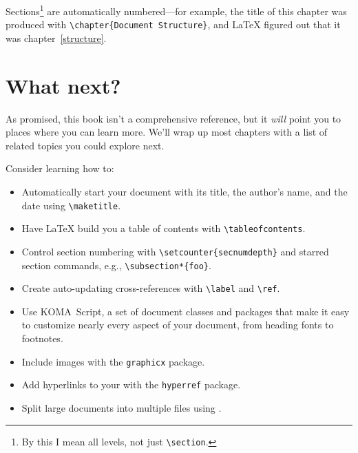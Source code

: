 Sections\footnote{By this I mean all levels, not just
\texttt{\textbackslash section}.}
are automatically numbered---for example,
the title of this chapter was produced with \verb|\chapter{Document Structure}|,
and \LaTeX{} figured out that it was chapter~\ref{structure}.

\section{What next?}

As promised, this book isn't a comprehensive reference,
but it \emph{will} point you to places where you can learn more.
We'll wrap up most chapters with a list of related topics you could
explore next.

Consider learning how to:
\begin{itemize}
\item Automatically start your document with its title, the author's name,
    and the date using \verb|\maketitle|.
\item Have \LaTeX{} build you a table of contents
    with \verb|\tableofcontents|.
\item Control section numbering with \verb|\setcounter{secnumdepth}|
and starred section commands, e.g., \verb|\subsection*{foo}|.
\item Create auto-updating cross-references with \verb|\label| and \verb|\ref|.
\item Use KOMA~Script, a set of document classes and packages
that make it easy to customize nearly every aspect of your document,
from heading fonts to footnotes.
\item Include images with the \texttt{graphicx} package.
\item Add hyperlinks to your  with the \texttt{hyperref} package.
\item Split large documents into multiple files using \verb||.
\end{itemize}
